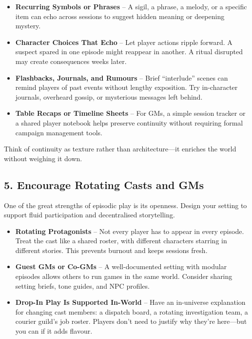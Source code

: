 \begin{itemize}
    \item \textbf{Recurring Symbols or Phrases} – A sigil, a phrase, a melody, or a specific item can echo across sessions to suggest hidden meaning or deepening mystery.

    \item \textbf{Character Choices That Echo} – Let player actions ripple forward. A suspect spared in one episode might reappear in another. A ritual disrupted may create consequences weeks later.

    \item \textbf{Flashbacks, Journals, and Rumours} – Brief “interlude” scenes can remind players of past events without lengthy exposition. Try in-character journals, overheard gossip, or mysterious messages left behind.

    \item \textbf{Table Recaps or Timeline Sheets} – For GMs, a simple session tracker or a shared player notebook helps preserve continuity without requiring formal campaign management tools.
\end{itemize}

Think of continuity as texture rather than architecture—it enriches the world without weighing it down.

\subsection*{5. Encourage Rotating Casts and GMs}

One of the great strengths of episodic play is its openness. Design your setting to support fluid participation and decentralised storytelling.

\begin{itemize}
    \item \textbf{Rotating Protagonists} – Not every player has to appear in every episode. Treat the cast like a shared roster, with different characters starring in different stories. This prevents burnout and keeps sessions fresh.

    \item \textbf{Guest GMs or Co-GMs} – A well-documented setting with modular episodes allows others to run games in the same world. Consider sharing setting briefs, tone guides, and NPC profiles.

    \item \textbf{Drop-In Play Is Supported In-World} – Have an in-universe explanation for changing cast members: a dispatch board, a rotating investigation team, a courier guild’s job roster. Players don’t need to justify why they’re here—but you can if it adds flavour.
\end{itemize}

